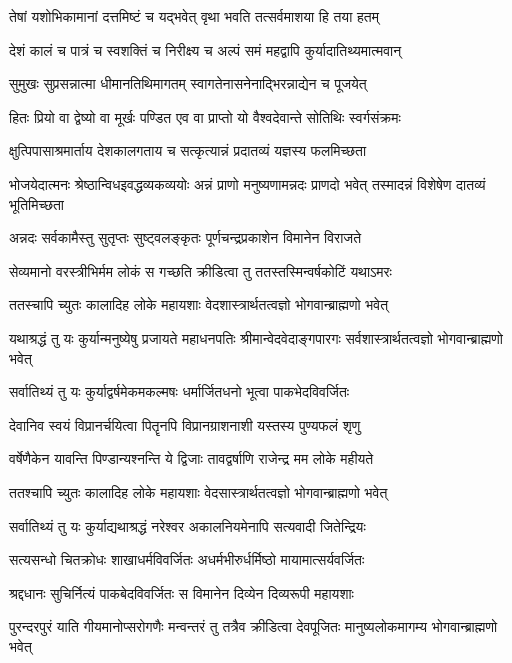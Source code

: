 \twolineshloka
{तेषां यशोभिकामानां दत्तमिष्टं च यद्भवेत्}
{वृथा भवति तत्सर्वमाशया हि तया हतम्}


\twolineshloka
{देशं कालं च पात्रं च स्वशक्तिं च निरीक्ष्य च}
{अल्पं समं महद्वापि कुर्यादातिथ्यमात्मवान्}


\twolineshloka
{सुमुखः सुप्रसन्नात्मा धीमानतिथिमागतम्}
{स्वागतेनासनेनाद्भिरन्नाद्येन च पूजयेत्}


\twolineshloka
{हितः प्रियो वा द्वेष्यो वा मूर्खः पण्डित एव वा}
{प्राप्तो यो वैश्वदेवान्ते सोतिथिः स्वर्गसंक्रमः}


\twolineshloka
{क्षुत्पिपासाश्रमार्ताय देशकालगताय च}
{सत्कृत्यान्नं प्रदातव्यं यज्ञस्य फलमिच्छता}


\threelineshloka
{भोजयेदात्मनः श्रेष्ठान्विधइवद्धव्यकव्ययोः}
{अन्नं प्राणो मनुष्यणामन्नदः प्राणदो भवेत्}
{तस्मादन्नं विशेषेण दातव्यं भूतिमिच्छता}


\twolineshloka
{अन्नदः सर्वकामैस्तु सुतृप्तः सुष्ट्वलङ्कृतः}
{पूर्णचन्द्रप्रकाशेन विमानेन विराजते}


\twolineshloka
{सेव्यमानो वरस्त्रीभिर्मम लोकं स गच्छति}
{क्रीडित्वा तु ततस्तस्मिन्वर्षकोटिं यथाऽमरः}


\twolineshloka
{ततस्चापि च्युतः कालादिह लोके महायशाः}
{वेदशास्त्रार्थतत्वज्ञो भोगवान्ब्राह्मणो भवेत्}


\threelineshloka
{यथाश्रद्धं तु यः कुर्यान्मनुष्येषु प्रजायते}
{महाधनपतिः श्रीमान्वेदवेदाङ्गपारगः}
{सर्वशास्त्रार्थतत्वज्ञो भोगवान्ब्राह्मणो भवेत्}


\twolineshloka
{सर्वातिथ्यं तु यः कुर्याद्वर्षमेकमकल्मषः}
{धर्मार्जितधनो भूत्वा पाकभेदविवर्जितः}


\twolineshloka
{देवानिव स्वयं विप्रानर्चयित्वा पितॄनपि}
{विप्रानग्राशनाशी यस्तस्य पुण्यफलं शृणु}


\twolineshloka
{वर्षेणैकेन यावन्ति पिण्डान्यश्नन्ति ये द्विजाः}
{तावद्वर्षाणि राजेन्द्र मम लोके महीयते}


\twolineshloka
{ततश्चापि च्युतः कालादिह लोके महायशाः}
{वेदसास्त्रार्थतत्वज्ञो भोगवान्ब्राह्मणो भवेत्}


\twolineshloka
{सर्वातिथ्यं तु यः कुर्याद्यथाश्रद्धं नरेश्वर}
{अकालनियमेनापि सत्यवादी जितेन्द्रियः}


\twolineshloka
{सत्यसन्धो चितक्रोधः शाखाधर्मविवर्जितः}
{अधर्मभीरुर्धर्मिष्ठो मायामात्सर्यवर्जितः}


\twolineshloka
{श्रद्दधानः सुचिर्नित्यं पाकबेदविवर्जितः}
{स विमानेन दिव्येन दिव्यरूपी महायशाः}


\threelineshloka
{पुरन्दरपुरं याति गीयमानोप्सरोगणैः}
{मन्वन्तरं तु तत्रैव क्रीडित्वा देवपूजितः}
{मानुष्यलोकमागम्य भोगवान्ब्राह्मणो भवेत्}


